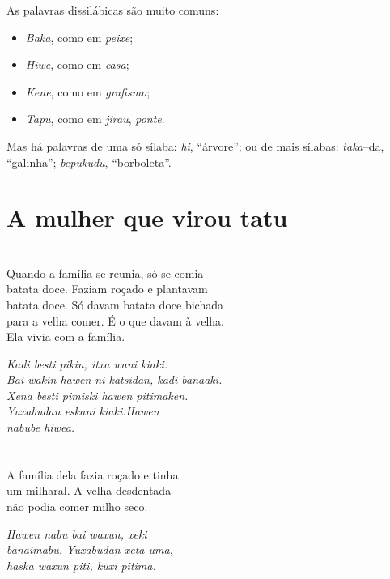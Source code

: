 As palavras dissilábicas são muito comuns:

\begin{itemize}
\item \textit{Baka}, como em \textit{peixe};
\item \textit{Hiwe}, como em \textit{casa};
\item \textit{Kene}, como em \textit{grafismo};
\item \textit{Tapu}, como em \textit{jirau}, \textit{ponte}.
\end{itemize}

Mas há palavras de uma só sílaba: \textit{hi}, ``árvore''; ou de mais sílabas: \textit{taka}--da, ``galinha''; \textit{bepukudu}, ``borboleta''.


\chapter{A mulher que virou tatu}

\chapter{}

Quando a família se reunia, só se comia\\
batata doce. Faziam roçado e plantavam\\
batata doce. Só davam batata doce bichada\\
para a velha comer. É o que davam à velha.\\
Ela vivia com a família.

\textit{Kadi besti pikin, itxa wani kiaki.\\
Bai wakin hawen ni katsidan, kadi banaaki.\\
Xena besti pimiski hawen pitimaken.\\
Yuxabudan eskani kiaki.Hawen\\
nabube hiwea.}

\chapter{}

A família dela fazia roçado e tinha\\
um milharal. A velha desdentada\\
não podia comer milho seco.

\textit{Hawen nabu bai waxun, xeki\\
banaimabu. Yuxabudan xeta uma,\\
haska waxun piti, kuxi pitima.}

